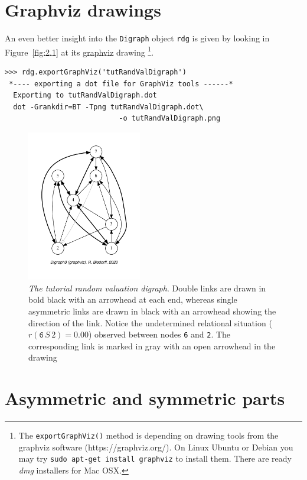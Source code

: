 \section{Graphviz drawings}
\label{sec:2.2}

An even better insight into the \texttt{Digraph} object \texttt{rdg} is given by looking in Figure~\vref{fig:2.1} at its \href{https://graphviz.org/}{graphviz} drawing \citep{graphviz}\footnote{The \texttt{exportGraphViz()} method is depending on drawing tools from the graphviz software (https://graphviz.org/). On Linux Ubuntu or Debian you may try \texttt{sudo apt-get install graphviz} to install them. There are ready \emph{dmg} installers for Mac OSX.}.
\begin{lstlisting}
>>> rdg.exportGraphViz('tutRandValDigraph')
 *---- exporting a dot file for GraphViz tools ------*
  Exporting to tutRandValDigraph.dot
  dot -Grankdir=BT -Tpng tutRandValDigraph.dot\
                           -o tutRandValDigraph.png
\end{lstlisting}
\begin{figure}[ht]
\sidecaption[t]
\includegraphics[width=5cm]{Figures/2-1-tutRandValDigraph.pdf}
\caption[The tutorial random valuation digraph]{\emph{The tutorial random valuation digraph}. Double links are drawn in bold black with an arrowhead at each end, whereas single asymmetric links are drawn in black with an arrowhead showing the direction of the link. Notice the undetermined relational situation ($r(\mathtt{6}\,S\,\mathtt{}2) = 0.00$) observed between nodes \texttt{6} and \texttt{2}. The corresponding link is marked in gray with an open arrowhead in the drawing}
\label{fig:2.1}       %
\end{figure}
  
\section{Asymmetric and symmetric parts}
\label{sec:2.3}

